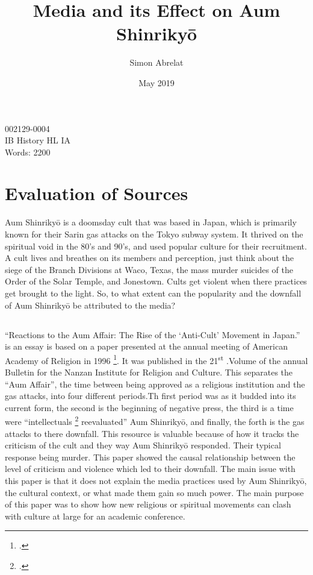 \documentclass[12pt, letterpaper]{article}
\title{Media and its Effect on Aum Shinriky\=o}
\author{Simon Abrelat}
\date{May 2019}
\newcommand{\sorta}[1]{`#1'}
\newcommand{\poses}[1]{#1's}
\newcommand{\say}[1]{``#1''}
\begin{document}
\doublespace{}
\parindent=0.5in

{\fontsize{12}{14.4}
  {\singlespace
    \maketitle
    \begin{center}
    002129-0004 \\
    \vspace{4mm}
    IB History HL IA \\
    \vspace{4mm}
    Words: 2200 \\ %
    \end{center}
  }
}	


\newpage
\tableofcontents
{}
\newpage

\section{Evaluation of Sources}
Aum Shinriky\=o is a doomsday cult that was based in Japan, which is primarily known for their Sarin gas
attacks on the Tokyo subway system. It thrived on the spiritual void in the \poses{80} and  \poses{90},
and used popular culture for their recruitment. A cult lives and breathes on its members and perception,
just think about the siege of the Branch Divisions at Waco, Texas, the mass murder suicides of the Order of
the Solar Temple, and Jonestown. Cults get violent when there practices get brought to the light. So, to
what extent can the popularity and the downfall of Aum Shinriky\=o be attributed to the media?

\subsection{}
\say{Reactions to the Aum Affair: The Rise of the \sorta{Anti-Cult} Movement in Japan.} is an essay is based
on a paper presented at the annual meeting of American Academy of Religion in 1996
\footcite{watanabe_reactions_1997}. It
was published in the 21\textsuperscript{st} .Volume of the annual Bulletin for the Nanzan Institute for
Religion and Culture. This separates the \say{Aum Affair}, the time between being approved as a religious
institution and the gas attacks, into four different periods.Th  first period was as it budded into its
current form, the second is the beginning of negative press, the third is a time were \say{intellectuals 
  \footcite[33]{watanabe_reactions_1997} reevaluated} Aum Shinriky\=o, and finally, the forth is the gas attacks to there downfall. This resource is valuable because of how it tracks the criticism of the cult and
they way Aum Shinriky\=o responded. Their typical response being murder. This paper showed the causal
relationship between the level of criticism and violence which led to their downfall. The main issue with
this paper is that it does not explain the media practices used by Aum Shinriky\=o, the cultural context, or
what made them gain so much power. The main purpose of  this paper was to show how new religious or spiritual
movements can clash with culture at large for an academic conference.
\end{document}
